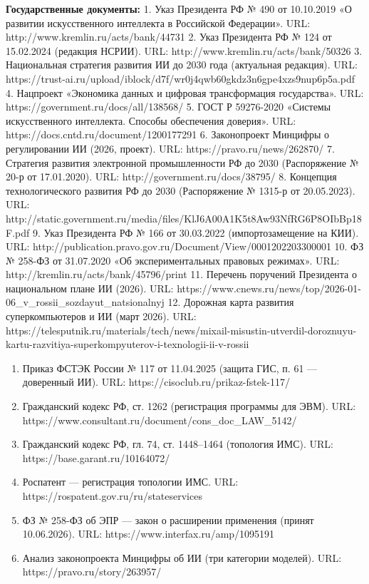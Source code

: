 \documentclass[
  russian,
]{article}
\providecommand{\tightlist}{%
  \setlength{\itemsep}{0pt}\setlength{\parskip}{0pt}}
\begin{document}
\textbf{Государственные документы:} 1. Указ Президента РФ № 490 от
10.10.2019 «О развитии искусственного интеллекта в Российской
Федерации». URL: http://www.kremlin.ru/acts/bank/44731 2. Указ
Президента РФ № 124 от 15.02.2024 (редакция НСРИИ). URL:
http://www.kremlin.ru/acts/bank/50326 3. Национальная стратегия развития
ИИ до 2030 года (актуальная редакция). URL:
https://trust-ai.ru/upload/iblock/d7f/wr0j4qwb60gkdz3n6gpe4xzs9nup6p5a.pdf
4. Нацпроект «Экономика данных и цифровая трансформация государства».
URL: https://government.ru/docs/all/138568/ 5. ГОСТ Р 59276-2020
«Системы искусственного интеллекта. Способы обеспечения доверия». URL:
https://docs.cntd.ru/document/1200177291 6. Законопроект Минцифры о
регулировании ИИ (2026, проект). URL: https://pravo.ru/news/262870/ 7.
Стратегия развития электронной промышленности РФ до 2030 (Распоряжение №
20-р от 17.01.2020). URL: http://government.ru/docs/38795/ 8. Концепция
технологического развития РФ до 2030 (Распоряжение № 1315-р от
20.05.2023). URL:
http://static.government.ru/media/files/KlJ6A00A1K5t8Aw93NfRG6P8OIbBp18F.pdf
9. Указ Президента РФ № 166 от 30.03.2022 (импортозамещение на КИИ).
URL: http://publication.pravo.gov.ru/Document/View/0001202203300001 10.
ФЗ № 258-ФЗ от 31.07.2020 «Об экспериментальных правовых режимах». URL:
http://kremlin.ru/acts/bank/45796/print 11. Перечень поручений
Президента о национальном плане ИИ (2026). URL:
https://www.cnews.ru/news/top/2026-01-06\_v\_rossii\_sozdayut\_natsionalnyj
12. Дорожная карта развития суперкомпьютеров и ИИ (март 2026). URL:
https://telesputnik.ru/materials/tech/news/mixail-misustin-utverdil-doroznuyu-kartu-razvitiya-superkompyuterov-i-texnologii-ii-v-rossii

\begin{enumerate}
\def\labelenumi{\arabic{enumi}.}
\setcounter{enumi}{12}
\tightlist
\item
  Приказ ФСТЭК России № 117 от 11.04.2025 (защита ГИС, п. 61 ---
  доверенный ИИ). URL: https://cisoclub.ru/prikaz-fstek-117/
\item
  Гражданский кодекс РФ, ст. 1262 (регистрация программы для ЭВМ). URL:
  https://www.consultant.ru/document/cons\_doc\_LAW\_5142/
\item
  Гражданский кодекс РФ, гл. 74, ст. 1448--1464 (топология ИМС). URL:
  https://base.garant.ru/10164072/
\item
  Роспатент --- регистрация топологии ИМС. URL:
  https://rospatent.gov.ru/ru/stateservices
\item
  ФЗ № 258-ФЗ об ЭПР --- закон о расширении применения (принят
  10.06.2026). URL: https://www.interfax.ru/amp/1095191
\item
  Анализ законопроекта Минцифры об ИИ (три категории моделей). URL:
  https://pravo.ru/story/263957/
\end{enumerate}
\end{document}
